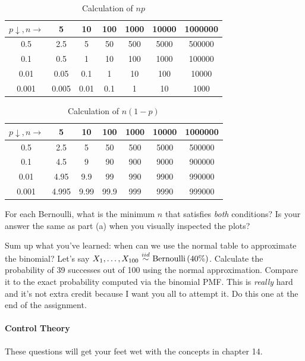 \documentclass[12pt]{article}
\begin{document}
\begin{table}[htp]
\centering
\begin{tabular}{c|cccccc}
$p \downarrow, n \rightarrow$	&5	&10	&100	&1000&	10000&	1000000 \\
\hline
0.5	&2.5	&5	&50	&500	&5000	&500000 \\
0.1	&0.5	&1	&10	&100	&1000	&100000 \\
0.01	&0.05	&0.1	&1 &	10	&100	&10000 \\
0.001&	0.005	&0.01	&0.1	&1	&10	&1000 \\
\end{tabular}
\label{tab:authorship}
\caption{Calculation of $np$}
\end{table}
\FloatBarrier

\begin{table}[htp]
\centering
\begin{tabular}{c|cccccc}
$p \downarrow, n \rightarrow$	&5	&10	&100	&1000&	10000&	1000000 \\
\hline
0.5	&2.5	&5	&50	&500	&5000	&500000 \\
0.1	&4.5	&9	&90	&900	&9000	&900000 \\
0.01	&4.95	&9.9	&99	&990	&9900	&990000 \\
0.001&	4.995	&9.99	&99.9	&999	&9990	&999000 \\
\end{tabular}
\label{tab:authorship}
\caption{Calculation of $n(1-p)$}
\end{table}
\FloatBarrier

For each Bernoulli, what is the minimum $n$ that satisfies \textit{both} conditions? Is your answer the same as part (a) when you visually inspected the plots?

\easysubproblem Sum up what you've learned: when can we use the normal table to approximate the binomial?
\hardsubproblem Let's say $X_1, \ldots, X_{100} \iid \bernoulli{40\%}$. Calculate the probability of 39 successes out of 100 using the normal approximation. Compare it to the exact probability computed via the binomial PMF. This is \textit{really} hard and it's not extra credit because I want you all to attempt it. Do this one at the end of the assignment.
\eenum

\paragraph{Control Theory} These questions will get your feet wet with the concepts in chapter 14. \\
\end{document}
